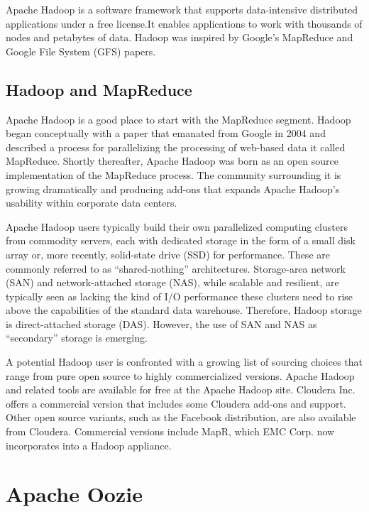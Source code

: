 \documentclass[11pt]{article} %
\begin{document}
Apache Hadoop is a software framework that supports data-intensive distributed applications under a free license.It enables applications to work with thousands of nodes and petabytes of data. Hadoop was inspired by Google's MapReduce and Google File System (GFS) papers.




\subsection{Hadoop and MapReduce}


Apache Hadoop is a good place to start with the MapReduce segment. Hadoop began conceptually with a paper that emanated from Google in 2004 and described a process for parallelizing the processing of web-based data it called MapReduce. Shortly thereafter, Apache Hadoop was born as an open source implementation of the MapReduce process. The community surrounding it is growing dramatically and producing add-ons that expands Apache Hadoop's usability within corporate data centers.


Apache Hadoop users typically build their own parallelized computing clusters from commodity servers, each with dedicated storage in the form of a small disk array or, more recently, solid-state drive (SSD) for performance. These are commonly referred to as “shared-nothing” architectures. Storage-area network (SAN) and network-attached storage (NAS), while scalable and resilient, are typically seen as lacking the kind of I/O performance these clusters need to rise above the capabilities of the standard data warehouse. Therefore, Hadoop storage is direct-attached storage (DAS). However, the use of SAN and NAS as “secondary” storage is emerging.


A potential Hadoop user is confronted with a growing list of sourcing choices that range from pure open source to highly commercialized versions. Apache Hadoop and related tools are available for free at the Apache Hadoop site. Cloudera Inc. offers a commercial version that includes some Cloudera add-ons and support. Other open source variants, such as the Facebook distribution, are also available from Cloudera. Commercial versions include MapR, which EMC Corp. now incorporates into a Hadoop appliance.





\newpage
\section{Apache Oozie}
\end{document}
